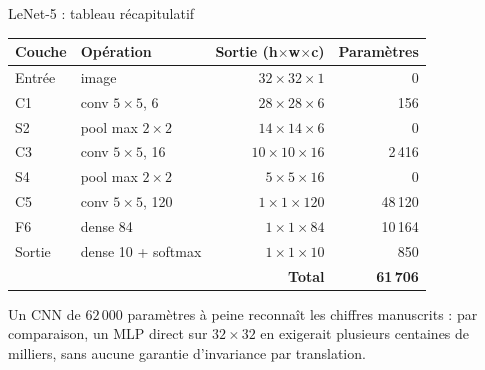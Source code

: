 \begin{frame}{LeNet-5 : tableau récapitulatif}
\begin{center}
\small
\begin{tabular}{@{}llrr@{}}
\toprule
\textbf{Couche} & \textbf{Opération} & \textbf{Sortie (h$\times$w$\times$c)}
 & \textbf{Paramètres} \\
\midrule
Entrée   & image               & $32 \times 32 \times 1$  & 0 \\
C1       & conv $5\times5$, 6  & $28 \times 28 \times 6$  & 156 \\
S2       & pool max $2\times2$ & $14 \times 14 \times 6$  & 0 \\
C3       & conv $5\times5$, 16 & $10 \times 10 \times 16$ & 2\,416 \\
S4       & pool max $2\times2$ & $5 \times 5 \times 16$   & 0 \\
C5       & conv $5\times5$, 120& $1 \times 1 \times 120$  & 48\,120 \\
F6       & dense 84            & $1 \times 1 \times 84$   & 10\,164 \\
Sortie   & dense 10 + softmax  & $1 \times 1 \times 10$   & 850 \\
\midrule
\multicolumn{3}{r}{\textbf{Total}} & \textbf{61\,706} \\
\bottomrule
\end{tabular}
\end{center}
\vspace{1mm}
\begin{kbox}[À retenir]
Un CNN de $62\,000$ paramètres à peine reconnaît les chiffres manuscrits :
par comparaison, un MLP direct sur $32\times32$ en exigerait plusieurs
centaines de milliers, sans aucune garantie d'invariance par translation.
\end{kbox}
\end{frame}

